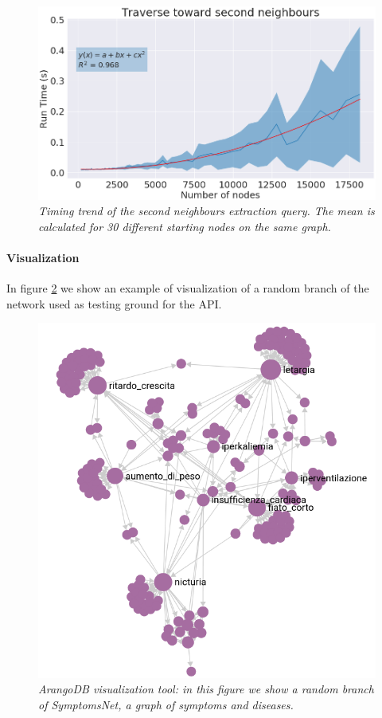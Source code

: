 \documentclass[11pt,twocolumn]{article}
\begin{document}
\begin{figure}[ht!]
   \includegraphics[width=\linewidth]{images/traverse_0_2_poly.png}
   \caption{\small{\textit{Timing trend of the second neighbours extraction query. The mean is calculated for 30 different starting nodes on the same graph.}}}
   \label{fig:tr_0_2}
\end{figure}

\newpage

\paragraph{Visualization}
In figure \ref{fig:3} we show an example of visualization of a random branch of the network used as testing ground for the API.

\begin{figure}[ht!]
   \includegraphics[width=\linewidth]{images/Sym_Net_crop.png}
   \caption{\small{\textit{ArangoDB visualization tool: in this figure we show a random branch of SymptomsNet, a graph of symptoms and diseases.}}}
   \label{fig:3}
\end{figure}
\end{document}

